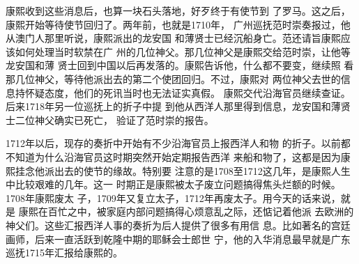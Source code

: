 \par
康熙收到这些消息后，也算一块石头落地，好歹终于有使节到%
了罗马。这之后，康熙开始等待使节回归了。两年前，也就是1710年，%
广州巡抚范时崇奏报过，他从澳门人那里听说，康熙派出的龙安国%
和薄贤士已经沉船身亡。范还请旨康熙应该如何处理当时软禁在广%
州的几位神父。那几位神父是康熙交给范时崇，让他等龙安国和薄%
贤士回到中国以后再发落的。康熙告诉他，什么都不要变，继续照%
看那几位神父，等待他派出去的第二个使团回归。不过，康熙对%
两位神父去世的信息持怀疑态度，他们的死讯当时也无法证实真假。%
康熙交代沿海官员继续查证。后来1718年另一位巡抚上的折子中提%
到他从西洋人那里得到信息，龙安国和薄贤士二位神父确实已死亡，%
验证了范时崇的报告。%
\par
1712年以后，现存的奏折中开始有不少沿海官员上报西洋人和物%
的折子。以前都不知道为什么沿海官员这时期突然开始定期报告西洋%
来船和物了，这都是因为康熙挂念他派出去的使节的缘故。特别要%
注意的是1708至1712这几年，是康熙人生中比较艰难的几年。这一%
时期正是康熙被太子废立问题搞得焦头烂额的时候。1708年康熙废太%
子，1709年又复立太子，1712年再废太子。用今天的话来说，就是%
康熙在百忙之中，被家庭内部问题搞得心烦意乱之际，还惦记着他派%
去欧洲的神父们。这些汇报西洋人事的奏折为后人提供了很多有用信%
息。比如著名的宫廷画师，后来一直活跃到乾隆中期的耶稣会士郎世%
宁，他的入华消息最早就是广东巡抚1715年汇报给康熙的。%
